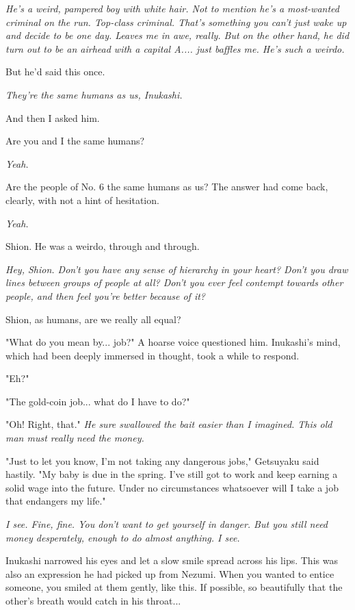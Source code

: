 \emph{He's a weird, pampered boy with white hair. Not to mention he's a
	most-wanted criminal on the run. Top-class criminal. That's something
	you can't just wake up and decide to be one day. Leaves me in awe,
	really. But on the other hand, he did turn out to be an airhead with a
	capital A.... just baffles me. He's such a weirdo.}

But he'd said this once.

\emph{They're the same humans as us, Inukashi.}

And then I asked him.

Are you and I the same humans?

\emph{Yeah.}

Are the people of No. 6 the same humans as us? The answer had come back,
clearly, with not a hint of hesitation.

\emph{Yeah.}

Shion. He was a weirdo, through and through.

\emph{Hey, Shion. Don't you have any sense of hierarchy in your heart? Don't
	you draw lines between groups of people at all? Don't you ever feel
	contempt towards other people, and then feel you're better because of
	it?}

Shion, as humans, are we really all equal?

"What do you mean by... job?" A hoarse voice questioned him. Inukashi's
mind, which had been deeply immersed in thought, took a while to
respond.

"Eh?"

"The gold-coin job... what do I have to do?"

"Oh! Right, that." \emph{He sure swallowed the bait easier than I imagined.
	This old man must really need the money.}

"Just to let you know, I'm not taking any dangerous jobs," Getsuyaku
said hastily. "My baby is due in the spring. I've still got to work and
keep earning a solid wage into the future. Under no circumstances
whatsoever will I take a job that endangers my life."

\emph{I see. Fine, fine. You don't want to get yourself in danger. But you
	still need money desperately, enough to do almost anything. I see.}

Inukashi narrowed his eyes and let a slow smile spread across his lips.
This was also an expression he had picked up from Nezumi. When you
wanted to entice someone, you smiled at them gently, like this. If
possible, so beautifully that the other's breath would catch in his
throat...

